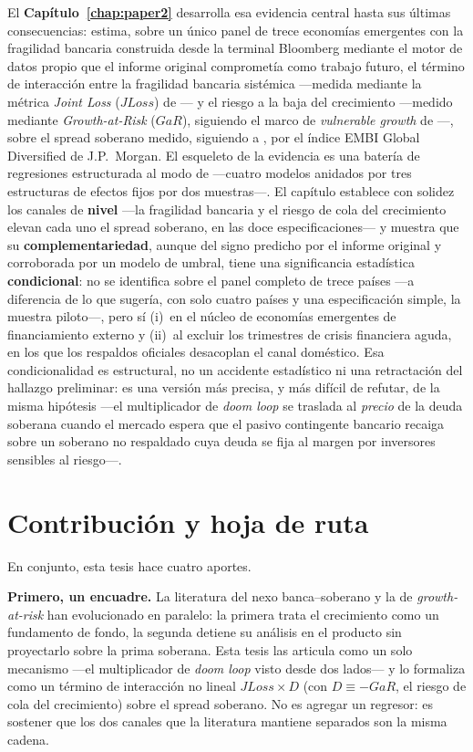 El \textbf{Capítulo~\ref{chap:paper2}} desarrolla esa evidencia central hasta sus últimas consecuencias: estima, sobre un único panel de trece economías emergentes con la fragilidad bancaria construida desde la terminal Bloomberg mediante el motor de datos propio que el informe original comprometía como trabajo futuro, el término de interacción entre la fragilidad bancaria sistémica —medida mediante la métrica \textit{Joint Loss} ($JLoss$) de \citet{Chari2024b}— y el riesgo a la baja del crecimiento —medido mediante \textit{Growth-at-Risk} ($GaR$), siguiendo el marco de \textit{vulnerable growth} de \citet{ABG2019b}—, sobre el spread soberano medido, siguiendo a \citet{Chari2024b}, por el índice EMBI Global Diversified de J.P.\ Morgan. El esqueleto de la evidencia es una batería de regresiones estructurada al modo de \citet{Chari2024b} —cuatro modelos anidados por tres estructuras de efectos fijos por dos muestras—. El capítulo establece con solidez los canales de \textbf{nivel} —la fragilidad bancaria y el riesgo de cola del crecimiento elevan cada uno el spread soberano, en las doce especificaciones— y muestra que su \textbf{complementariedad}, aunque del signo predicho por el informe original y corroborada por un modelo de umbral, tiene una significancia estadística \textbf{condicional}: no se identifica sobre el panel completo de trece países —a diferencia de lo que sugería, con solo cuatro países y una especificación simple, la muestra piloto—, pero sí (i)~en el núcleo de economías emergentes de financiamiento externo y (ii)~al excluir los trimestres de crisis financiera aguda, en los que los respaldos oficiales desacoplan el canal doméstico. Esa condicionalidad es estructural, no un accidente estadístico ni una retractación del hallazgo preliminar: es una versión más precisa, y más difícil de refutar, de la misma hipótesis —el multiplicador de \textit{doom loop} se traslada al \emph{precio} de la deuda soberana cuando el mercado espera que el pasivo contingente bancario recaiga sobre un soberano no respaldado cuya deuda se fija al margen por inversores sensibles al riesgo—.

\section{Contribución y hoja de ruta}

En conjunto, esta tesis hace cuatro aportes.

\textbf{Primero, un encuadre.} La literatura del nexo banca--soberano y la de \textit{growth-at-risk} han evolucionado en paralelo: la primera trata el crecimiento como un fundamento de fondo, la segunda detiene su análisis en el producto sin proyectarlo sobre la prima soberana. Esta tesis las articula como un solo mecanismo —el multiplicador de \textit{doom loop} visto desde dos lados— y lo formaliza como un término de interacción no lineal $JLoss\times D$ (con $D\equiv-GaR$, el riesgo de cola del crecimiento) sobre el spread soberano. No es agregar un regresor: es sostener que los dos canales que la literatura mantiene separados son la misma cadena.

